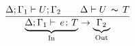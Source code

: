 \begin{figure}[h!]
  \begin{gather*}
    \frac{\Delta;\Gamma_1 \vdash U;\Gamma_2 \qquad \Delta \vdash U\,\thicksim\,T}
         {\underbrace{\Delta;\Gamma_1 \vdash \, e \colon T}_{\text{In}} \rightarrow \underbrace{\Gamma_2}_{\text{Out}}}
  \end{gather*}
  \label{fig:check-against}
\end{figure}


